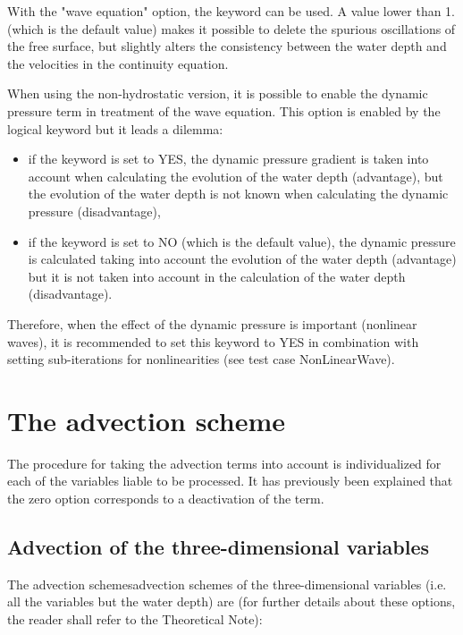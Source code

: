 With the "wave equation" option, the keyword  can be used. A value lower than 1. (which is the default value) makes
it possible to delete the spurious oscillations of the free surface, but
slightly alters the consistency between the water depth and the velocities in
the continuity equation.

When using the non-hydrostatic version, it is possible to enable the dynamic
pressure term in treatment of the wave equation. This option is enabled by the
logical keyword  but it leads a
dilemma:

\begin{itemize}
\item if the keyword is set to YES, the dynamic pressure gradient is taken
into account when calculating the evolution of the water depth (advantage), but
the evolution of the water depth is not known when calculating the dynamic
pressure (disadvantage),

\item if the keyword is set to NO (which is the default value), the dynamic
pressure is calculated taking into account the evolution of the water depth
(advantage) but it is not taken into account in the calculation of the water
depth (disadvantage).
\end{itemize}

Therefore, when the effect of the dynamic pressure is important (nonlinear
waves), it is recommended to set this keyword to YES in combination with
setting sub-iterations for nonlinearities (see test case NonLinearWave).


\section{The advection scheme}
\label{sec:advection}
The procedure for taking the advection terms into account is individualized
for each of the variables liable to be processed. It has previously been
explained that the zero option corresponds to a deactivation of the term.


\subsection{Advection of the three-dimensional variables}

The advection schemesadvection schemes of the three-dimensional variables (i.e.
all the variables but the water depth) are (for further details about these
options, the reader shall refer to the Theoretical Note):

